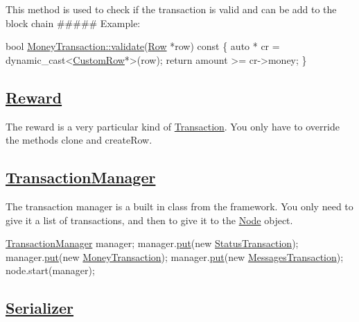 This method is used to check if the transaction is valid and can be add to the block chain \#\#\#\#\# Example\+: 
\begin{DoxyCode}
\textcolor{keywordtype}{bool} \mbox{\hyperlink{classMoneyTransaction_a20c58901a2aa8c51b73d56000545e82c}{MoneyTransaction::validate}}(\mbox{\hyperlink{classRow}{Row}} *row)\textcolor{keyword}{ const }\{
    \textcolor{keyword}{auto} * cr = \textcolor{keyword}{dynamic\_cast<}\mbox{\hyperlink{classCustomRow}{CustomRow}}*\textcolor{keyword}{>}(row);
    \textcolor{keywordflow}{return} amount >= cr->money;
\}
\end{DoxyCode}
 \subsection*{\mbox{\hyperlink{classReward}{Reward}}}

The reward is a very particular kind of \mbox{\hyperlink{classTransaction}{Transaction}}. You only have to override the methods {\ttfamily clone} and {\ttfamily create\+Row}. \subsection*{\mbox{\hyperlink{classTransactionManager}{Transaction\+Manager}}}

The transaction manager is a built in class from the framework. You only need to give it a list of transactions, and then to give it to the \mbox{\hyperlink{classNode}{Node}} object. 
\begin{DoxyCode}
\mbox{\hyperlink{classTransactionManager}{TransactionManager}} manager;
manager.\mbox{\hyperlink{classTransactionManager_a7956f511249bba3466ce3f3b57ee4518}{put}}(\textcolor{keyword}{new} \mbox{\hyperlink{classStatusTransaction}{StatusTransaction}});
manager.\mbox{\hyperlink{classTransactionManager_a7956f511249bba3466ce3f3b57ee4518}{put}}(\textcolor{keyword}{new} \mbox{\hyperlink{classMoneyTransaction}{MoneyTransaction}});
manager.\mbox{\hyperlink{classTransactionManager_a7956f511249bba3466ce3f3b57ee4518}{put}}(\textcolor{keyword}{new} \mbox{\hyperlink{classMessagesTransaction}{MessagesTransaction}});
node.start(manager);
\end{DoxyCode}
 \subsection*{\mbox{\hyperlink{classSerializer}{Serializer}}}

